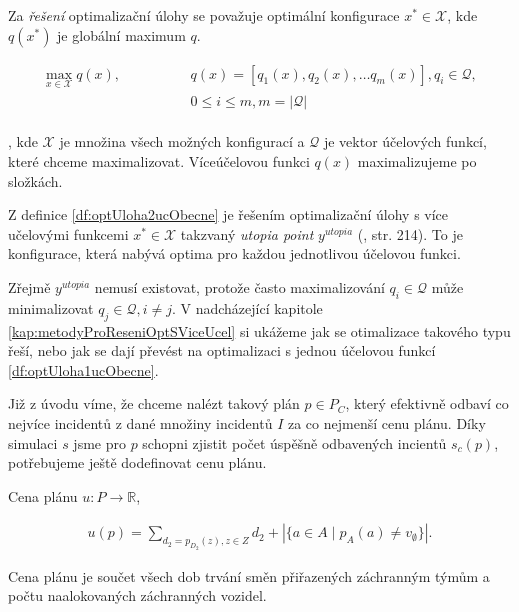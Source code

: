 \begin{definice}\label{df:reseniOptUlohSJednouUcFunOb}
  Za \textit{řešení} optimalizační úlohy se považuje optimální konfigurace $x^* \in \mathcal{X}$,
  kde $q(x^*)$ je globální maximum $q$.
\end{definice}

\begin{definice}\label{df:optUloha2ucObecne}
  \begin{align*}
    \max_{x \in \mathcal{X}} q(x), \hspace{50pt} &q(x) = [q_1(x), q_2(x), \dots q_{m}(x)], q_i \in \mathcal{Q}, \\
                                                 &0 \leq i \leq m, m = |\mathcal{Q}| 
  \end{align*}
  \\
  , kde $\mathcal{X}$ je množina všech možných konfigurací a $\mathcal{Q}$ je vektor účelových funkcí, které chceme maximalizovat.
  Víceúčelovou funkci $q(x)$ maximalizujeme po složkách.
\end{definice}

\begin{definice}
  Z definice \ref{df:optUloha2ucObecne} je řešením optimalizační úlohy s více učelovými funkcemi 
  $x^* \in \mathcal{X}$ takzvaný \textit{utopia point} $y^{utopia}$ (\citet{AlgOptBook}, str. 214).
  To je konfigurace, která nabývá optima pro každou jednotlivou účelovou funkci.
\end{definice}

Zřejmě $y^{utopia}$ nemusí existovat, protože často maximalizování $q_i \in \mathcal{Q}$ může minimalizovat $q_j \in \mathcal{Q}, i \neq j$.
V nadcházející kapitole \ref{kap:metodyProReseniOptSViceUcel} si ukážeme jak se otimalizace takového typu řeší, nebo jak se dají převést na 
optimalizaci s jednou účelovou funkcí \ref{df:optUloha1ucObecne}.

Již z úvodu víme, že chceme nalézt takový plán $p \in P_C$, který efektivně odbaví co nejvíce incidentů z dané množiny incidentů $I$ za co nejmenší cenu plánu.
Díky simulaci $s$ jsme pro $p$ schopni zjistit počet úspěšně odbavených incientů $s_c(p)$, potřebujeme ještě dodefinovat cenu plánu.

\begin{definice}\label{df:cenaPlanu}
  Cena plánu $u \colon P \rightarrow \mathbb{R}$,

  \begin{align*}
    u(p) = \sum_{d_2 = p_{D_2}(z), z \in Z} d_2 + |\{ a \in A \mid p_{A}(a) \neq v_{\emptyset} \}|.
  \end{align*}

  Cena plánu je součet všech dob trvání směn přiřazených záchranným týmům a počtu naalokovaných záchranných vozidel.
\end{definice}

